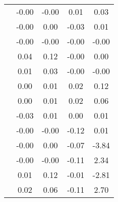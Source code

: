 \begin{table}
\begin{tabular}{c|cc|cc|}
\multicolumn{1}{|c|}{} & \multicolumn{1}{|c|}{     -0.00} & \multicolumn{1}{|c|}{     -0.00} & \multicolumn{1}{|c|}{      0.01} & \multicolumn{1}{|c|}{      0.03} \\ 
\multicolumn{1}{|c|}{} & \multicolumn{1}{|c|}{     -0.00} & \multicolumn{1}{|c|}{      0.00} & \multicolumn{1}{|c|}{     -0.03} & \multicolumn{1}{|c|}{      0.01} \\ 
\multicolumn{1}{|c|}{} & \multicolumn{1}{|c|}{     -0.00} & \multicolumn{1}{|c|}{     -0.00} & \multicolumn{1}{|c|}{     -0.00} & \multicolumn{1}{|c|}{     -0.00} \\ 
\multicolumn{1}{|c|}{} & \multicolumn{1}{|c|}{      0.04} & \multicolumn{1}{|c|}{      0.12} & \multicolumn{1}{|c|}{     -0.00} & \multicolumn{1}{|c|}{      0.00} \\ 
\multicolumn{1}{|c|}{} & \multicolumn{1}{|c|}{      0.01} & \multicolumn{1}{|c|}{      0.03} & \multicolumn{1}{|c|}{     -0.00} & \multicolumn{1}{|c|}{     -0.00} \\ 
\multicolumn{1}{|c|}{} & \multicolumn{1}{|c|}{      0.00} & \multicolumn{1}{|c|}{      0.01} & \multicolumn{1}{|c|}{      0.02} & \multicolumn{1}{|c|}{      0.12} \\ 
\multicolumn{1}{|c|}{} & \multicolumn{1}{|c|}{      0.00} & \multicolumn{1}{|c|}{      0.01} & \multicolumn{1}{|c|}{      0.02} & \multicolumn{1}{|c|}{      0.06} \\ 
\multicolumn{1}{|c|}{} & \multicolumn{1}{|c|}{     -0.03} & \multicolumn{1}{|c|}{      0.01} & \multicolumn{1}{|c|}{      0.00} & \multicolumn{1}{|c|}{      0.01} \\ 
\multicolumn{1}{|c|}{} & \multicolumn{1}{|c|}{     -0.00} & \multicolumn{1}{|c|}{     -0.00} & \multicolumn{1}{|c|}{     -0.12} & \multicolumn{1}{|c|}{      0.01} \\ 
\multicolumn{1}{|c|}{} & \multicolumn{1}{|c|}{     -0.00} & \multicolumn{1}{|c|}{      0.00} & \multicolumn{1}{|c|}{     -0.07} & \multicolumn{1}{|c|}{     -3.84} \\ 
\multicolumn{1}{|c|}{} & \multicolumn{1}{|c|}{     -0.00} & \multicolumn{1}{|c|}{     -0.00} & \multicolumn{1}{|c|}{     -0.11} & \multicolumn{1}{|c|}{      2.34} \\ 
\multicolumn{1}{|c|}{} & \multicolumn{1}{|c|}{      0.01} & \multicolumn{1}{|c|}{      0.12} & \multicolumn{1}{|c|}{     -0.01} & \multicolumn{1}{|c|}{     -2.81} \\ 
\multicolumn{1}{|c|}{} & \multicolumn{1}{|c|}{      0.02} & \multicolumn{1}{|c|}{      0.06} & \multicolumn{1}{|c|}{     -0.11} & \multicolumn{1}{|c|}{      2.70} \\ 

\end{tabular}
\end{table}
